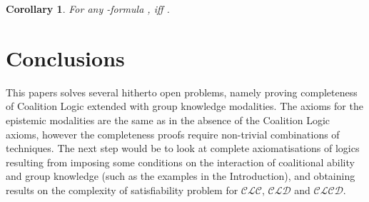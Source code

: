 \documentclass{article}
\newtheorem{corollary}{Corollary}
\newcommand{\acro}[1]{\ensuremath{\mathcal{#1}}}
\begin{document}
\begin{corollary}
  For any -formula ,   iff .
\end{corollary}


\section{Conclusions}
\label{sec:conclusions}

This papers solves several hitherto open problems, namely proving
completeness of Coalition Logic extended with group knowledge
modalities. The axioms for the epistemic modalities are the same as in
the absence of the Coalition Logic axioms, however the completeness
proofs require non-trivial combinations of techniques. The next step
would be to look at complete axiomatisations of logics resulting from
imposing some conditions on the interaction of coalitional ability and
group knowledge (such as the examples in the Introduction), and
obtaining results on the complexity of satisfiability problem for
\acro{CLC}, \acro{CLD} and \acro{CLCD}.



\end{document}
